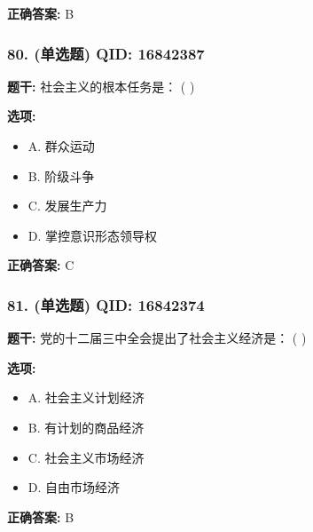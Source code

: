 \documentclass[12pt,UTF8]{ctexart}
\begin{document}
\textbf{正确答案:}
B

\vspace{0.3em}\hrulefill\vspace{0.7em}

\subsubsection*{80. (单选题) \small QID: 16842387}

\textbf{题干:}
社会主义的根本任务是： ( )

\textbf{选项:}
\begin{itemize}[leftmargin=*]

  \item A. 群众运动

  \item B. 阶级斗争

  \item C. 发展生产力

  \item D. 掌控意识形态领导权

\end{itemize}

\textbf{正确答案:}
C

\vspace{0.3em}\hrulefill\vspace{0.7em}

\subsubsection*{81. (单选题) \small QID: 16842374}

\textbf{题干:}
党的十二届三中全会提出了社会主义经济是： ( )

\textbf{选项:}
\begin{itemize}[leftmargin=*]

  \item A. 社会主义计划经济

  \item B. 有计划的商品经济

  \item C. 社会主义市场经济

  \item D. 自由市场经济

\end{itemize}

\textbf{正确答案:}
B

\vspace{0.3em}\hrulefill\vspace{0.7em}
\end{document}
